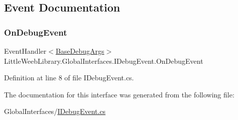 \subsection{Event Documentation}
\mbox{\label{interface_little_weeb_library_1_1_global_interfaces_1_1_i_debug_event_a98e8f7816df18ade00fb1b7f285bd335}} 
\subsubsection{\texorpdfstring{On\+Debug\+Event}{OnDebugEvent}}
{\footnotesize\ttfamily Event\+Handler$<$\mbox{\hyperlink{class_little_weeb_library_1_1_event_arguments_1_1_base_debug_args}{Base\+Debug\+Args}}$>$ Little\+Weeb\+Library.\+Global\+Interfaces.\+I\+Debug\+Event.\+On\+Debug\+Event}



Definition at line 8 of file I\+Debug\+Event.\+cs.



The documentation for this interface was generated from the following file\+:\begin{DoxyCompactItemize}
\item 
Global\+Interfaces/\mbox{\hyperlink{_i_debug_event_8cs}{I\+Debug\+Event.\+cs}}\end{DoxyCompactItemize}
